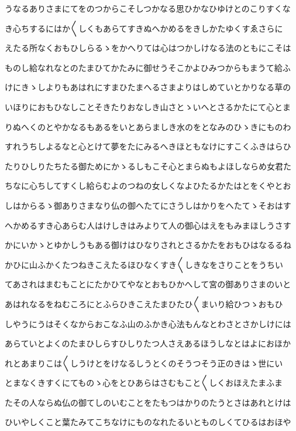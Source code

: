 \documentclass[a4paper,11pt,landscape]{ltjtarticle}
\begin{document}
うなるありさまにてをのつからこそしつかなる思ひかなひゆけとのこりすくな
\par\medskip
き心ちするにはか〱しくもあらてすきぬへかめるをきしかたゆくすゑさらに
\par\medskip
えたる所なくおもひしらるゝをかへりては心はつかしけなる法のともにこそは
\par\medskip
ものし給なれなとのたまひてかたみに御せうそこかよひみつからもまうて給ふ
\par\medskip
けにきゝしよりもあはれにすまひたまへるさまよりはしめていとかりなる草の
\par\medskip
いほりにおもひなしことそきたりおなしき山さとゝいへとさるかたにて心とま
\par\medskip
りぬへくのとやかなるもあるをいとあらましき水のをとなみのひゝきにものわ
\par\medskip
すれうちしよるなと心とけて夢をたにみるへきほともなけにすこくふきはらひ
\par\medskip
たりひしりたちたる御ためにかゝるしもこそ心とまらぬもよほしならめ女君た
\par\medskip
ちなに心ちしてすくし給らむよのつねの女しくなよひたるかたはとをくやとお
\par\medskip
しはからるゝ御ありさまなり仏の御へたてにさうしはかりをへたてゝそおはす
\par\medskip
へかめるすき心あらむ人はけしきはみよりて人の御心はえをもみまほしうさす
\par\medskip
かにいかゝとゆかしうもある御けはひなりされとさるかたをおもひはなるるね
\par\medskip
かひに山ふかくたつねきこえたるほひなくすき〱しきなをさりことをうちい
\par\medskip
てあされはまむもことにたかひてやなとおもひかへして宮の御ありさまのいと
\par\medskip
あはれなるをねむころにとふらひきこえたまひたひ〱まいり給ひつゝおもひ
\par\medskip
しやうにうはそくなからおこなふ山のふかき心法もんなとわさとさかしけには
\par\medskip
あらていとよくのたまひしらすひしりたつ人さえあるほうしなとはよにおほか
\par\medskip
れとあまりこは〱しうけとをけなるしうとくのそうつそう正のきはゝ世にい
\par\medskip
とまなくきすくにてものゝ心をとひあらはさむもこと〱しくおほえたまふま
\par\medskip
たその人ならぬ仏の御てしのいむことをたもつはかりのたうとさはあれとけは
\par\medskip
ひいやしくこと葉たみてこちなけにものなれたるいとものしくてひるはおほや
\end{document}
